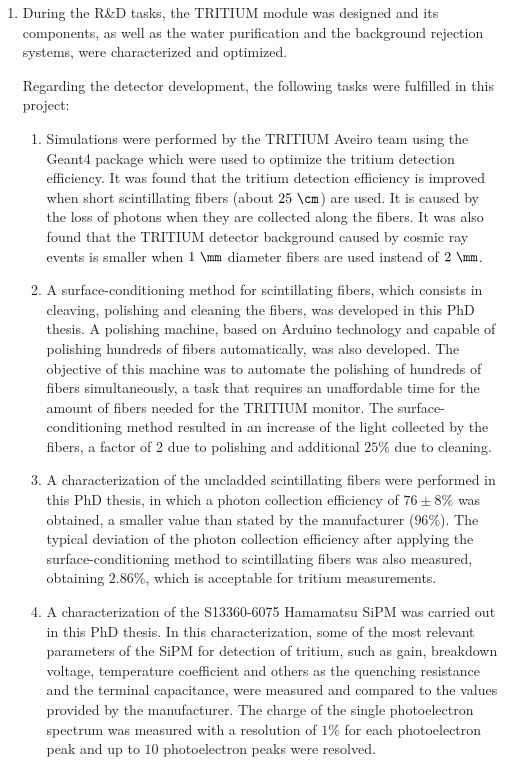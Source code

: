 \begin{enumerate}
\item{} During the R\&D tasks, the TRITIUM module was designed and its components, as well as the water purification and the background rejection systems, were characterized and optimized. 

Regarding the detector development, the following tasks were fulfilled in this project:

\begin{enumerate}
\item{} Simulations were performed by the TRITIUM Aveiro team using the Geant4 package which were used to optimize the tritium detection efficiency. It was found that the tritium detection efficiency is improved when short scintillating fibers (about $25~\cm$) are used. It is caused by the loss of photons when they are collected along the fibers. It was also found that the TRITIUM detector background caused by cosmic ray events is smaller when $1~\mm$ diameter fibers are used instead of $2~\mm$.

\item{} A surface-conditioning method for scintillating fibers, which consists in cleaving, polishing and cleaning the fibers, was developed in this PhD thesis. A polishing machine, based on Arduino technology and capable of polishing hundreds of fibers automatically, was also developed. The objective of this machine was to automate the polishing of hundreds of fibers simultaneously, a task that requires an unaffordable time for the amount of fibers needed for the TRITIUM monitor. The surface-conditioning method resulted in an increase of the light collected by the fibers, a factor of 2 due to polishing and additional $25\%$ due to cleaning. 

\item{} A characterization of the uncladded scintillating fibers were performed in this PhD thesis, in which a photon collection efficiency of $76\pm 8\%$ was obtained, a smaller value than stated by the manufacturer ($96\%$). The typical deviation of the photon collection efficiency after applying the surface-conditioning method to scintillating fibers was also measured, obtaining $2.86\%$, which is acceptable for tritium measurements.

\item{} A characterization of the S13360-6075 Hamamatsu SiPM was carried out in this PhD thesis. In this characterization, some of the most relevant parameters of the SiPM for detection of tritium, such as gain, breakdown voltage, temperature coefficient and others as the quenching resistance and the terminal capacitance, were measured and compared to the values provided by the manufacturer. The charge of the single photoelectron spectrum was measured with a resolution of $1\%$ for each photoelectron peak and up to $10$ photoelectron peaks were resolved. %


\end{enumerate}
\end{enumerate}
